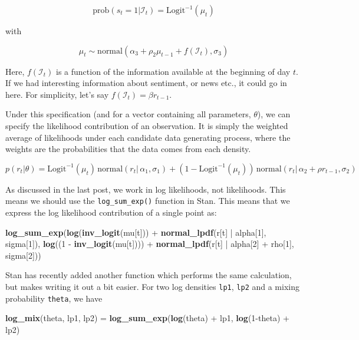 \documentclass[]{book}
\newenvironment{Shaded}{\begin{snugshade}}{\end{snugshade}}
\newcommand{\KeywordTok}[1]{\textcolor[rgb]{0.13,0.29,0.53}{\textbf{{#1}}}}
\newcommand{\DecValTok}[1]{\textcolor[rgb]{0.00,0.00,0.81}{{#1}}}
\newcommand{\StringTok}[1]{\textcolor[rgb]{0.31,0.60,0.02}{{#1}}}
\newcommand{\NormalTok}[1]{{#1}}
\begin{document}
\[
\mbox{prob}(s_{t}=1 | \mathcal{I}_{t}) = \mbox{Logit}^{-1}(\mu_{t})
\]

with

\[
\mu_{t} \sim \mbox{normal}(\alpha_{3} + \rho_{2}\mu_{t-1} + f(\mathcal{I}_{t}), \sigma_{3})
\]

Here, \(f(\mathcal{I}_{t})\) is a function of the information available
at the beginning of day \(t\). If we had interesting information about
sentiment, or news etc., it could go in here. For simplicity, let's say
\(f(\mathcal{I}_{t}) = \beta r_{t-1}\).

Under this specification (and for a vector containing all parameters,
\(\theta\)), we can specify the likelihood contribution of an
observation. It is simply the weighted average of likelihoods under each
candidate data generating process, where the weights are the
probabilities that the data comes from each density.

\[
p(r_{t} | \theta) = \mbox{Logit}^{-1}(\mu_{t})\, \mbox{normal}(r_{t}|\, \alpha_{1}, \sigma_{1}) + (1-\mbox{Logit}^{-1}(\mu_{t}))\, \mbox{normal}(r_{t}|\, \alpha_{2} + \rho r_{t-1}, \sigma_{2})
\]

As discussed in the last post, we work in log likelihoods, not
likelihoods. This means we should use the \texttt{log\_sum\_exp()}
function in Stan. This means that we express the log likelihood
contribution of a single point as:

\begin{Shaded}
\begin{Highlighting}[]
\KeywordTok{log_sum_exp}\NormalTok{(}\KeywordTok{log}\NormalTok{(}\KeywordTok{inv_logit}\NormalTok{(mu[t])) +}\StringTok{ }\KeywordTok{normal_lpdf}\NormalTok{(r[t] |}\StringTok{ }\NormalTok{alpha[}\DecValTok{1}\NormalTok{], sigma[}\DecValTok{1}\NormalTok{]),}
            \KeywordTok{log}\NormalTok{((}\DecValTok{1} \NormalTok{-}\StringTok{ }\KeywordTok{inv_logit}\NormalTok{(mu[t]))) +}\StringTok{ }\KeywordTok{normal_lpdf}\NormalTok{(r[t] |}\StringTok{ }\NormalTok{alpha[}\DecValTok{2}\NormalTok{] +}\StringTok{ }\NormalTok{rho[}\DecValTok{1}\NormalTok{], sigma[}\DecValTok{2}\NormalTok{]))}
\end{Highlighting}
\end{Shaded}

Stan has recently added another function which performs the same
calculation, but makes writing it out a bit easier. For two log
densities \texttt{lp1}, \texttt{lp2} and a mixing probability
\texttt{theta}, we have

\begin{Shaded}
\begin{Highlighting}[]
\KeywordTok{log_mix}\NormalTok{(theta, lp1, lp2) =}\StringTok{ }\KeywordTok{log_sum_exp}\NormalTok{(}\KeywordTok{log}\NormalTok{(theta) +}\StringTok{ }\NormalTok{lp1,}
                                       \KeywordTok{log}\NormalTok{(}\DecValTok{1}\NormalTok{-theta) +}\StringTok{ }\NormalTok{lp2)}
\end{Highlighting}
\end{Shaded}
\end{document}
